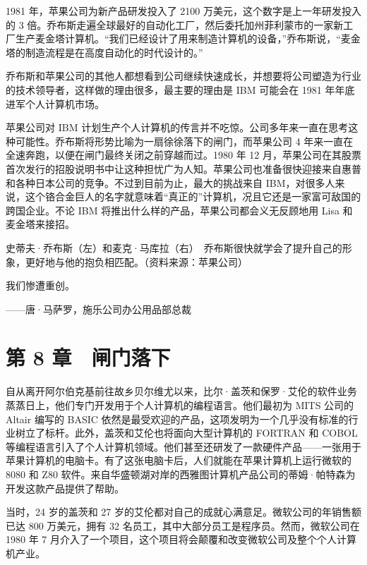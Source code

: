 \documentclass[12pt,UTF8]{ctexbook}
\begin{document}
1981 年，苹果公司为新产品研发投入了 2100 万美元，这个数字是上一年研发投入的 3 倍。乔布斯走遍全球最好的自动化工厂，然后委托加州菲利蒙市的一家新工厂生产麦金塔计算机。“我们已经设计了用来制造计算机的设备，”乔布斯说，“麦金塔的制造流程是在高度自动化的时代设计的。”

乔布斯和苹果公司的其他人都想看到公司继续快速成长，并想要将公司塑造为行业的技术领导者，这样做的理由很多，最主要的理由是 IBM 可能会在 1981 年年底进军个人计算机市场。

苹果公司对 IBM 计划生产个人计算机的传言并不吃惊。公司多年来一直在思考这种可能性。乔布斯将形势比喻为一扇徐徐落下的闸门，而苹果公司 4 年来一直在全速奔跑，以便在闸门最终关闭之前穿越而过。1980 年 12 月，苹果公司在其股票首次发行的招股说明书中让这种担忧广为人知。苹果公司也准备很快迎接来自惠普和各种日本公司的竞争。不过到目前为止，最大的挑战来自 IBM，对很多人来说，这个铬合金巨人的名字就意味着“真正的”计算机，况且它还是一家富可敌国的跨国企业。不论 IBM 将推出什么样的产品，苹果公司都会义无反顾地用 Lisa 和麦金塔来接招。



史蒂夫·乔布斯（左）和麦克·马库拉（右）　乔布斯很快就学会了提升自己的形象，更好地与他的抱负相匹配。（资料来源：苹果公司）





我们惨遭重创。

——唐·马萨罗，施乐公司办公用品部总裁





\chapter{第 8 章　闸门落下}


自从离开阿尔伯克基前往故乡贝尔维尤以来，比尔·盖茨和保罗·艾伦的软件业务蒸蒸日上，他们专门开发用于个人计算机的编程语言。他们最初为 MITS 公司的 Altair 编写的 BASIC 依然是最受欢迎的产品，这项发明为一个几乎没有标准的行业树立了标杆。此外，盖茨和艾伦也将面向大型计算机的 FORTRAN 和 COBOL 等编程语言引入了个人计算机领域。他们甚至还研发了一款硬件产品——一张用于苹果计算机的电脑卡。有了这张电脑卡后，人们就能在苹果计算机上运行微软的 8080 和 Z80 软件。来自华盛顿湖对岸的西雅图计算机产品公司的蒂姆·帕特森为开发这款产品提供了帮助。

当时，24 岁的盖茨和 27 岁的艾伦都对自己的成就心满意足。微软公司的年销售额已达 800 万美元，拥有 32 名员工，其中大部分员工是程序员。然而，微软公司在 1980 年 7 月介入了一个项目，这个项目将会颠覆和改变微软公司及整个个人计算机产业。
\end{document}
